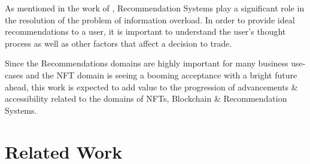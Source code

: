 \documentclass[a4paper, 12pt, oneside]{report}
\begin{document}
As mentioned in the work of \textcite{cheng_hybrid_2020}, Recommendation Systems play a significant role in the resolution of the problem of information overload. In order to provide ideal recommendations to a user, it is important to understand the user's thought process as well as other factors that affect a decision to trade.


Since the Recommendations domains are highly important for many business use-cases and the NFT domain is seeing a booming acceptance with a bright future ahead, this work is expected to add value to the progression of advancements \& accessibility related to the domains of NFTs, Blockchain \& Recommendation Systems.
\endgroup

\chapter{Related Work}
\end{document}
